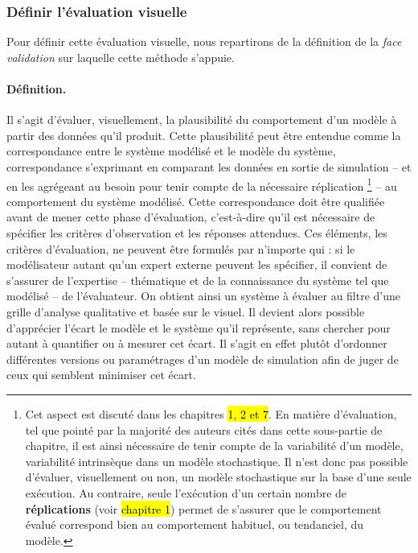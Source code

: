 \subsubsection{Définir l'évaluation visuelle} Pour définir cette évaluation visuelle, nous repartirons de la définition de la \textit{face validation} sur laquelle cette méthode s'appuie.

\paragraph{Définition.} Il s'agit d'évaluer, visuellement, la plausibilité du comportement d'un modèle à partir des données qu'il produit.
Cette plausibilité peut être entendue comme la correspondance entre le système modélisé et le modèle du système, correspondance s'exprimant en comparant les données en sortie de simulation -- et en les agrégeant au besoin pour tenir compte de la nécessaire réplication
\footnote{
	Cet aspect est discuté dans les chapitres \hl{1, 2 et 7}.
	En matière d'évaluation, tel que pointé par la majorité des auteurs cités dans cette sous-partie de chapitre, il est ainsi nécessaire de tenir compte de la variabilité d'un modèle, variabilité intrinsèque dans un modèle stochastique.
	Il n'est donc pas possible d'évaluer, visuellement ou non, un modèle stochastique sur la base d'une seule exécution. Au contraire, seule l'exécution d'un certain nombre de \textbf{réplications} (voir \hl{chapitre 1}) permet de s'assurer que le comportement évalué correspond bien au comportement habituel, ou tendanciel, du modèle.
} -- au comportement du système modélisé.
Cette correspondance doit être qualifiée avant de mener cette phase d'évaluation, c'est-à-dire qu'il est nécessaire de spécifier les critères d'observation et les réponses attendues.
Ces éléments, les critères d'évaluation, ne peuvent être formulés par n'importe qui : si le modélisateur autant qu'un expert externe peuvent les spécifier, il convient de s'assurer de l'expertise -- thématique et de la connaissance du système tel que modélisé -- de l'évaluateur.
On obtient ainsi un système à évaluer au filtre d'une grille d'analyse qualitative et basée sur le visuel.
Il devient alors possible d'apprécier l'écart le modèle et le système qu'il représente, sans chercher pour autant à quantifier ou à mesurer cet écart. 
Il s'agit en effet plutôt d'ordonner différentes versions ou paramétrages d'un modèle de simulation afin de juger de ceux qui semblent minimiser cet écart.

